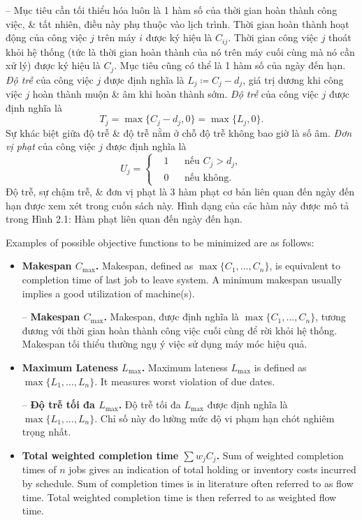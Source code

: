 \documentclass{article}
\begin{document}
\begin{itemize}
\begin{itemize}
        -- Mục tiêu cần tối thiểu hóa luôn là 1 hàm số của thời gian hoàn thành công việc, \& tất nhiên, điều này phụ thuộc vào lịch trình. Thời gian hoàn thành hoạt động của công việc $j$ trên máy $i$ được ký hiệu là $C_{ij}$. Thời gian công việc $j$ thoát khỏi hệ thống (tức là thời gian hoàn thành của nó trên máy cuối cùng mà nó cần xử lý) được ký hiệu là $C_j$. Mục tiêu cũng có thể là 1 hàm số của ngày đến hạn. {\it Độ trễ} của công việc $j$ được định nghĩa là $L_j\coloneqq C_j - d_j$, giá trị dương khi công việc $j$ hoàn thành muộn \& âm khi hoàn thành sớm. {\it Độ trễ} của công việc $j$ được định nghĩa là
        \begin{equation*}
            T_j = \max\{C_j - d_j,0\} = \max\{L_j,0\}.
        \end{equation*}
        Sự khác biệt giữa độ trễ \& độ trễ nằm ở chỗ độ trễ không bao giờ là số âm. {\it Đơn vị phạt} của công việc $j$ được định nghĩa là
        \begin{equation*}
            U_j = \left\{\begin{split}
                &1&&\mbox{nếu } C_j > d_j,\\
                &0&&\mbox{nếu không}.
            \end{split}\right.
        \end{equation*}
        Độ trễ, sự chậm trễ, \& đơn vị phạt là 3 hàm phạt cơ bản liên quan đến ngày đến hạn được xem xét trong cuốn sách này. Hình dạng của các hàm này được mô tả trong {\sf Hình 2.1: Hàm phạt liên quan đến ngày đến hạn}.

        Examples of possible objective functions to be minimized are as follows:
        \begin{itemize}
            \item {\bf Makespan $C_{\max}$.} Makespan, defined as $\max\{C_1,\ldots,C_n\}$, is equivalent to completion time of last job to leave system. A minimum makespan usually implies a good utilization of machine(s).

            -- {\bf Makespan $C_{\max}$.} Makespan, được định nghĩa là $\max\{C_1,\ldots,C_n\}$, tương đương với thời gian hoàn thành công việc cuối cùng để rời khỏi hệ thống. Makespan tối thiểu thường ngụ ý việc sử dụng máy móc hiệu quả.
            \item {\bf Maximum Lateness $L_{\max}$.} Maximum lateness $L_{\max}$ is defined as $\max\{L_1,\ldots,L_n\}$. It measures worst violation of due dates.

            -- {\bf Độ trễ tối đa $L_{\max}$.} Độ trễ tối đa $L_{\max}$ được định nghĩa là $\max\{L_1,\ldots,L_n\}$. Chỉ số này đo lường mức độ vi phạm hạn chót nghiêm trọng nhất.
            \item {\bf Total weighted completion time $\sum w_jC_j$.} Sum of weighted completion times of $n$ jobs gives an indication of total holding or inventory costs incurred by schedule. Sum of completion times is in literature often referred to as flow time. Total weighted completion time is then referred to as weighted flow time.


\end{itemize}
\end{itemize}
\end{itemize}
\end{document}
